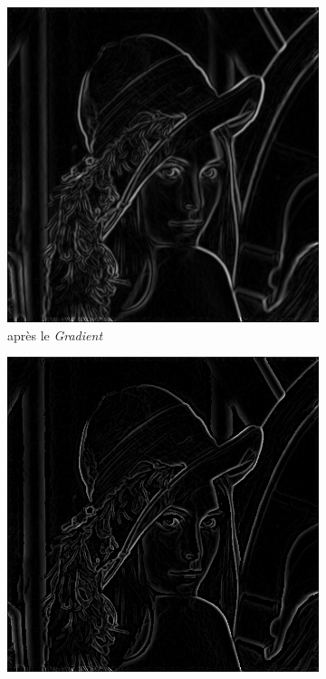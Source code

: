 \documentclass[hidelinks,11pt]{article}
\theoremstyle{mytheoremstyle}
\theoremstyle{mytheoremstyle}
\theoremstyle{myproblemstyle}
\begin{document}
   \begin{figure}
    \centering
    \begin{subfigure}[b]{0.3\textwidth}
        \centering
        \includegraphics[width=\textwidth]{figs/fig7a}
        \caption{après le \textit{Gradient}}
    \end{subfigure}
    \hfill
    \begin{subfigure}[b]{0.3\textwidth}
        \centering
        \includegraphics[width=\textwidth]{figs/fig7b}

\end{subfigure}
\end{figure}
\end{document}
